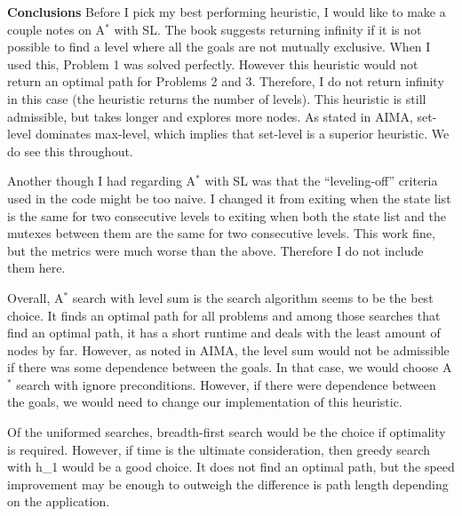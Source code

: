 \documentclass{article}
\begin{document}
{\Large \textbf{Conclusions}}
\vskip1pt
Before I pick my best performing heuristic, I would like to make a couple notes on A$^*$ with SL. The book suggests returning infinity if it is not possible to find a level where all the goals are not mutually exclusive. When I used this, Problem 1 was solved perfectly. However this heuristic would not return an optimal path for Problems 2 and 3. Therefore, I do not return infinity in this case (the heuristic returns the number of levels). This heuristic is still admissible, but takes longer and explores more nodes. As stated in AIMA, set-level dominates max-level, which implies that set-level is a superior heuristic. We do see this throughout.

Another though I had regarding A$^*$ with SL was that the ``leveling-off'' criteria used in the code might be too naive. I changed it from exiting when the state list is the same for two consecutive levels to exiting when both the state list and the mutexes between them are the same for two consecutive levels. This work fine, but the metrics were much worse than the above. Therefore I do not include them here.

Overall, A$^*$ search with level sum is the search algorithm seems to be the best choice. It finds an optimal path for all problems and among those searches that find an optimal path, it has a short runtime and deals with the least amount of nodes by far. However, as noted in AIMA, the level sum would not be admissible if there was some dependence between the goals. In that case, we would choose A$^*$ search with ignore preconditions. However, if there were dependence between the goals, we would need to change our implementation of this heuristic.

Of the uniformed searches, breadth-first search would be the choice if optimality is required. However, if time is the ultimate consideration, then greedy search with h\_1 would be a good choice. It does not find an optimal path, but the speed improvement may be enough to outweigh the difference is path length depending on the application.
\end{document}
